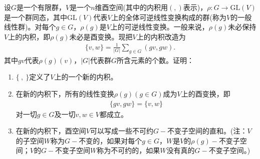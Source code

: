 \documentclass[../../main.tex]{subfiles}%
\begin{document}
\begin{example}
设$G$是一个有限群，$V$是一个$n$维酉空间(其中的内积用$(,)$表示)，$\rho:G\to \mathrm{GL}(V)$是一个群同态，其中$\mathrm{GL}(V)$代表$V$上的全体可逆线性变换构成的群(称为$V$的一般线性群)。对每个$g\in G$，$\rho(g)$是$V$上的可逆线性变换。一般来说，$\rho(g)$未必保持$V$上的内积，即$\rho(g)$未必是酉变换。现把$V$上的内积改造为
\begin{align*}
\{v,w\}=\frac{1}{|G|}\sum\limits_{g\in G}(gv,gw).
\end{align*}
其中$gv$代表$\rho(g)(v)$，$|G|$代表群$G$所含元素的个数。证明：
\begin{enumerate}[(1)]
\item $\{\ ,\ \}$定义了$V$上的一个新的内积。
\item 在新的内积下，所有的线性变换$\rho(g)(g\in G)$成为$V$上的酉变换，即
\begin{align*}
\{gv,gw\}=\{v,w\}
\end{align*}
对一切$g\in G$及一切$v,w\in V$都成立。
\item 在新的内积下，酉空间$V$可以写成一些不可约$G-$不变子空间的直和。(注：$V$的子空间$W$称为$G-$不变的，如果对每个$g\in G$，$W$是$V$的$\rho(g)-$不变子空间；$V$的$G-$不变子空间$W$称为不可约的，如果$W$没有真的$G-$不变子空间。)
\end{enumerate}
\end{example}
\end{document}
